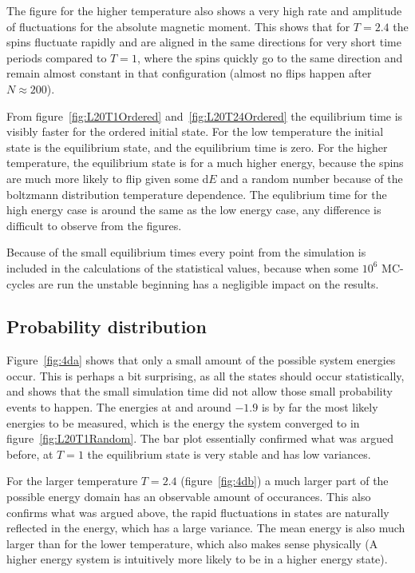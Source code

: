 \documentclass[aps,reprint]{revtex4-1}
\begin{document}
The figure for the higher temperature also shows a very high rate and amplitude
of fluctuations for the absolute magnetic moment. This shows that for $T = 2.4$
the spins fluctuate rapidly and are aligned in the same directions for very short
time periods compared to $T = 1$, where the spins quickly go to the same direction
and remain almost constant in that configuration (almost no flips happen after
$N \approx 200$).

From figure~\ref{fig:L20T1Ordered} and~\ref{fig:L20T24Ordered} the equilibrium
time is visibly faster for the ordered initial state. For the low temperature
the initial state is the equilibrium state, and the equilibrium time is zero.
For the higher temperature, the equilibrium state is for a much higher energy,
because the spins are much more likely to flip given some d$E$ and a random
number because of the boltzmann distribution temperature dependence. The equlibrium
time for the high energy case is around the same as the low energy case, any difference
is difficult to observe from the figures.

Because of the small equilibrium times every point from the simulation is included
in the calculations of the statistical values, because when some $10^6$ MC-cycles
are run the unstable beginning has a negligible impact on the results.

\subsection{Probability distribution}
Figure~\ref{fig:4da} shows that only a small amount of the possible system energies occur.
This is perhaps a bit surprising, as all the states should occur statistically,
and shows that the small simulation time did not allow those small probability events to
happen. The energies at and around $-1.9$ is by far the most likely energies to be measured,
which is the energy the system converged to in figure~\ref{fig:L20T1Random}. The
bar plot essentially confirmed what was argued before, at $T = 1$ the equilibrium state
is very stable and has low variances.

For the larger temperature $T = 2.4$ (figure~\ref{fig:4db}) a much larger part of
the possible energy domain has an observable amount of occurances. This also confirms
what was argued above, the rapid fluctuations in states are naturally reflected in the
energy, which has a large variance. The mean energy is also much larger than for the lower
temperature, which also makes sense physically (A higher energy system is intuitively
more likely to be in a higher energy state).
\end{document}

